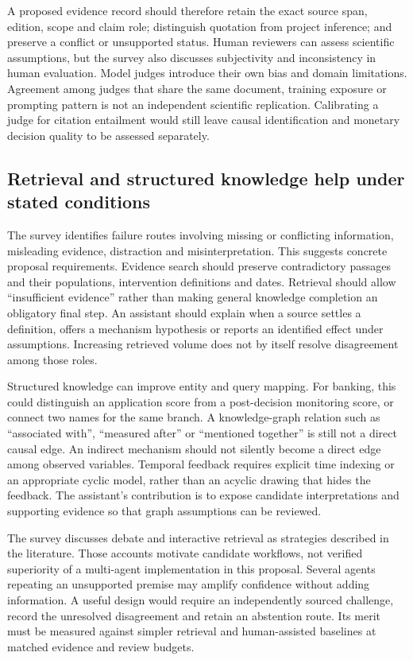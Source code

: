 A proposed evidence record should therefore retain the exact source span,
edition, scope and claim role; distinguish quotation from project inference;
and preserve a conflict or unsupported status. Human reviewers can assess
scientific assumptions, but the survey also discusses subjectivity and
inconsistency in human evaluation. Model judges introduce their own bias and
domain limitations. Agreement among judges that share the same document,
training exposure or prompting pattern is not an independent scientific
replication. Calibrating a judge for citation entailment would still leave
causal identification and monetary decision quality to be assessed separately.

\subsection{Retrieval and structured knowledge help under stated conditions}

The survey identifies failure routes involving missing or conflicting
information, misleading evidence, distraction and misinterpretation. This
suggests concrete proposal requirements. Evidence search should preserve
contradictory passages and their populations, intervention definitions and
dates. Retrieval should allow ``insufficient evidence'' rather than making
general knowledge completion an obligatory final step. An assistant should
explain when a source settles a definition, offers a mechanism hypothesis or
reports an identified effect under assumptions. Increasing retrieved volume
does not by itself resolve disagreement among those roles.

Structured knowledge can improve entity and query mapping. For banking, this
could distinguish an application score from a post-decision monitoring score,
or connect two names for the same branch. A knowledge-graph relation such as
``associated with'', ``measured after'' or ``mentioned together'' is still not
a direct causal edge. An indirect mechanism should not silently become a
direct edge among observed variables. Temporal feedback requires explicit
time indexing or an appropriate cyclic model, rather than an acyclic drawing
that hides the feedback. The assistant's contribution is to expose candidate
interpretations and supporting evidence so that graph assumptions can be
reviewed.

The survey discusses debate and interactive retrieval as strategies described
in the literature. Those accounts motivate candidate workflows, not verified
superiority of a multi-agent implementation in this proposal. Several agents
repeating an unsupported premise may amplify confidence without adding
information. A useful design would require an independently sourced challenge,
record the unresolved disagreement and retain an abstention route. Its merit
must be measured against simpler retrieval and human-assisted baselines at
matched evidence and review budgets.

